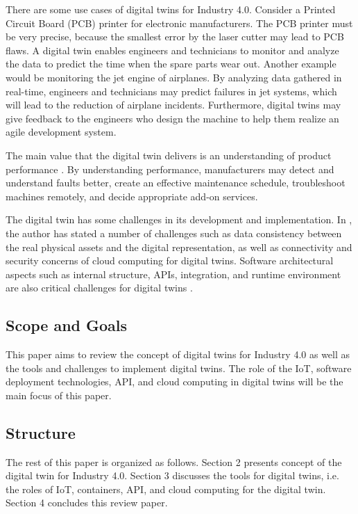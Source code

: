 \documentclass[article]{aaltoseries}
\begin{document}
There are some use cases of digital twins for Industry 4.0. Consider a Printed Circuit Board (PCB) printer for electronic manufacturers. The PCB printer must be very precise, because the smallest error by the laser cutter may lead to PCB flaws. A digital twin enables engineers and technicians to monitor and analyze the data to predict the time when the spare parts wear out. Another example would be monitoring the jet engine of airplanes. By analyzing data gathered in real-time, engineers and technicians may predict failures in jet systems, which will lead to the reduction of airplane incidents. Furthermore, digital twins may give feedback to the engineers who design the machine to help them realize an agile development system.

The main value that the digital twin delivers is an understanding of product performance \cite{Cheatshe3:online}. By understanding performance, manufacturers may detect and understand faults better, create an effective maintenance schedule, troubleshoot machines remotely, and decide appropriate add-on services.

The digital twin has some challenges in its development and implementation. In \cite{bienhaus2017patterns}, the author has stated a number of challenges such as data consistency between the real physical assets and the digital representation, as well as connectivity and security concerns of cloud computing for digital twins. Software architectural aspects such as internal structure, APIs, integration, and runtime environment are also critical challenges for digital twins \cite{malakuti2018architectural}.

\subsection{Scope and Goals}
\label{sec:emphasis}
This paper aims to review the concept of digital twins for Industry 4.0 as well as the tools and challenges to implement digital twins. The role of the IoT, software deployment technologies, API, and cloud computing in digital twins will be the main focus of this paper.

\subsection{Structure}
\label{sec:em}
The rest of this paper is organized as follows. Section 2 presents concept of the digital twin for Industry 4.0. Section 3 discusses the tools for digital twins, i.e. the roles of IoT, containers, API, and cloud computing for the digital twin. Section 4 concludes this review paper.
 
\end{document}
